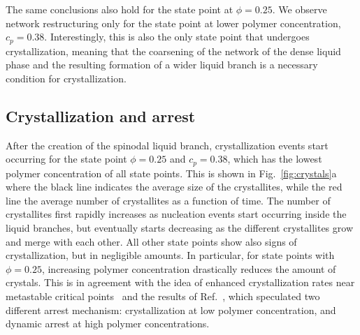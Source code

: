 \documentclass[a4paper,preprint,superscriptaddress]{revtex4}
\begin{document}
The same conclusions also hold for the state point at $\phi=0.25$. We observe network restructuring only for the state point
at lower polymer concentration, $c_p=0.38$. Interestingly, this is also the only state point that undergoes crystallization,
meaning that the coarsening of the network of the dense liquid phase and the resulting formation of a wider liquid branch is a necessary condition for crystallization. 

\subsection*{Crystallization and arrest}

After the creation of the spinodal liquid branch, crystallization events start occurring for the state point $\phi=0.25$ and $c_p=0.38$, which has the lowest
polymer concentration of all state points. This is shown in Fig.~\ref{fig:crystals}a where the black line indicates the average size of the crystallites,
while the red line the average number of crystallites as a function of time. The number of crystallites first rapidly increases as nucleation events
start occurring inside the liquid branches, but eventually starts decreasing as the different crystallites grow and merge with each other.
All other state points show also signs of crystallization, but in negligible amounts. In particular, for state points with $\phi=0.25$, increasing
polymer concentration drastically reduces the amount of crystals. This is in agreement with the
idea of enhanced crystallization rates near metastable critical points~\cite{ten1997enhancement,olmsted1998spinodal} and the
results of Ref.~\cite{fortini2008crystallization,perez2011pathways},
which speculated two different arrest mechanism: crystallization at low polymer concentration, and dynamic arrest at high polymer concentrations.
\end{document}

